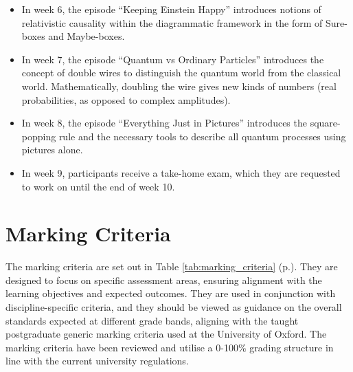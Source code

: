 \begin{itemize}
\item In week 6, the episode ``Keeping Einstein Happy'' introduces notions of relativistic causality within the diagrammatic framework in the form of Sure-boxes and Maybe-boxes. 
\item In week 7, the episode ``Quantum vs Ordinary Particles'' introduces the concept of double wires to distinguish the quantum world from the classical world. Mathematically, doubling the wire gives new kinds of numbers (real probabilities, as opposed to complex amplitudes).
\item In week 8, the episode ``Everything Just in Pictures'' introduces the square-popping rule and the necessary tools to describe all quantum processes using pictures alone.
\item In week 9, participants receive a take-home exam, which they are requested to work on until the end of week 10.
\end{itemize}



\section{Marking Criteria}

The marking criteria are set out in Table \ref{tab:marking_criteria} (p.\pageref{tab:marking_criteria}).
They are designed to focus on specific assessment areas, ensuring alignment with the learning objectives and expected outcomes.
They are used in conjunction with discipline-specific criteria, and they should be viewed as guidance on the overall standards expected at different grade bands, aligning with the taught postgraduate generic marking criteria used at the University of Oxford.
The marking criteria have been reviewed and utilise a 0-100\% grading structure in line with the current university regulations.

\renewcommand{\arraystretch}{1.1}
\makeatletter
\renewcommand{\fnum@figure}{Table \thefigure}
\makeatother

